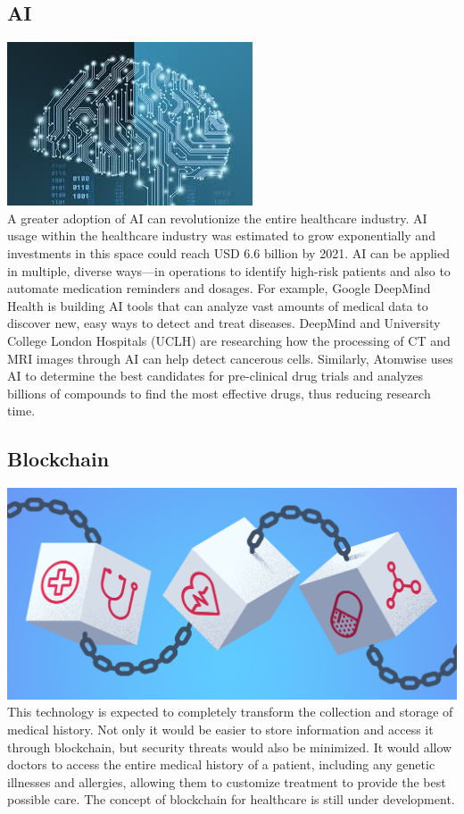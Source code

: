 \documentclass[12pt]{article}
\begin{document}
\subsection*{AI}
 \includegraphics[scale=0.6]{ai.jpeg }
 \\
A greater adoption of AI can revolutionize the entire healthcare industry. AI usage within the healthcare industry was estimated to grow exponentially and investments in this space could reach USD 6.6 billion by 2021. AI can be applied in multiple, diverse ways—in operations to identify high-risk patients and also to automate medication reminders and dosages. For example, Google DeepMind Health is building AI tools that can analyze vast amounts of medical data to discover new, easy ways to detect and treat diseases. DeepMind and University College London Hospitals (UCLH) are researching how the processing of CT and MRI images through AI can help detect cancerous cells. Similarly, Atomwise uses AI to determine the best candidates for pre-clinical drug trials and analyzes billions of compounds to find the most effective drugs, thus reducing research time.
\subsection*{Blockchain}
 \includegraphics[scale=0.2]{bl.png}
 \\
This technology is expected to completely transform the collection and storage of medical history. Not only it would be easier to store information and access it through blockchain, but security threats would also be minimized. It would allow doctors to access the entire medical history of a patient, including any genetic illnesses and allergies, allowing them to customize treatment to provide the best possible care. The concept of blockchain for healthcare is still under development.
\end{document}

